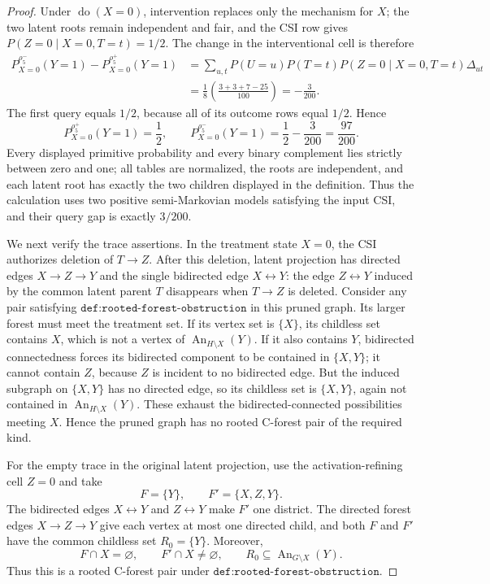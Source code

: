 \documentclass{article}
\begin{document}
\begin{proof}
Under \(\operatorname{do}(X=0)\), intervention replaces only the mechanism for \(X\); the two latent roots remain independent and fair, and the CSI row gives \(P(Z=0\mid X=0,T=t)=1/2\).  The change in the interventional cell is therefore
\[
 \begin{aligned}
 P_{X=0}^{\rho^-_5}(Y=1)-P_{X=0}^{\rho^+_5}(Y=1)
 &=\sum_{u,t}P(U=u)P(T=t)P(Z=0\mid X=0,T=t)\Delta_{ut}\\
 &=\frac18\left(\frac{3+3+7-25}{100}\right)
 =-\frac3{200}.
 \end{aligned}
\]
The first query equals \(1/2\), because all of its outcome rows equal \(1/2\).  Hence
\[
 P_{X=0}^{\rho^+_5}(Y=1)=\frac12,
 \qquad
 P_{X=0}^{\rho^-_5}(Y=1)=\frac12-\frac3{200}=\frac{97}{200}.
\]
Every displayed primitive probability and every binary complement lies strictly between zero and one; all tables are normalized, the roots are independent, and each latent root has exactly the two children displayed in the definition.  Thus the calculation uses two positive semi-Markovian models satisfying the input CSI, and their query gap is exactly \(3/200\).

We next verify the trace assertions.  In the treatment state \(X=0\), the CSI authorizes deletion of \(T\to Z\).  After this deletion, latent projection has directed edges \(X\to Z\to Y\) and the single bidirected edge \(X\leftrightarrow Y\): the edge \(Z\leftrightarrow Y\) induced by the common latent parent \(T\) disappears when \(T\to Z\) is deleted.  Consider any pair satisfying \(\texttt{def:rooted-forest-obstruction}\) in this pruned graph.  Its larger forest must meet the treatment set.  If its vertex set is \(\{X\}\), its childless set contains \(X\), which is not a vertex of \(\operatorname{An}_{H\setminus X}(Y)\).  If it also contains \(Y\), bidirected connectedness forces its bidirected component to be contained in \(\{X,Y\}\); it cannot contain \(Z\), because \(Z\) is incident to no bidirected edge.  But the induced subgraph on \(\{X,Y\}\) has no directed edge, so its childless set is \(\{X,Y\}\), again not contained in \(\operatorname{An}_{H\setminus X}(Y)\).  These exhaust the bidirected-connected possibilities meeting \(X\).  Hence the pruned graph has no rooted C-forest pair of the required kind.

For the empty trace in the original latent projection, use the activation-refining cell \(Z=0\) and take
\[
 F=\{Y\},\qquad F'=\{X,Z,Y\}.
\]
The bidirected edges \(X\leftrightarrow Y\) and \(Z\leftrightarrow Y\) make \(F'\) one district.  The directed forest edges \(X\to Z\to Y\) give each vertex at most one directed child, and both \(F\) and \(F'\) have the common childless set \(R_0=\{Y\}\).  Moreover,
\[
 F\cap X=\varnothing,
 \qquad
 F'\cap X\ne\varnothing,
 \qquad
 R_0\subseteq\operatorname{An}_{G\setminus X}(Y).
\]
Thus this is a rooted C-forest pair under \(\texttt{def:rooted-forest-obstruction}\).


\end{proof}
\end{document}
